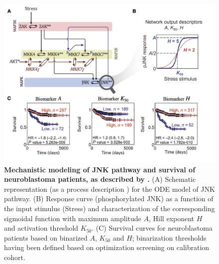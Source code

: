 \documentclass[a4paper,12pt,twoside,onecolumn,openright,final,oldfontcommands]{memoir}
\begin{document}
\begin{figure}

{\centering \includegraphics[width=0.9\linewidth]{fig/fey} 

}

\caption[Mechanistic modeling of JNK pathway and survival of neuroblastoma patients, as described by Fey \emph{et al}.]{\textbf{Mechanistic modeling of JNK pathway and
survival of neuroblastoma patients, as described by
\citet{fey2015signaling}.} (A) Schematic representation (as a process
description \citep{le2015quantitative}) for the ODE model of JNK
pathway. (B) Response curve (phosphorylated JNK) as a function of the
input stimulus (Stress) and characterization of the corresponding
sigmoidal function with maximum amplitude \(A\), Hill exponent \(H\) and
activation threshold \(K_{50}\). (C) Survival curves for neuroblastoma
patients based on binarized \(A\), \(K_{50}\) and \(H\); binarization
thresholds having been defined based on optimization screening on
calibration cohort.}\label{fig:fey2}
\end{figure}
\end{document}
